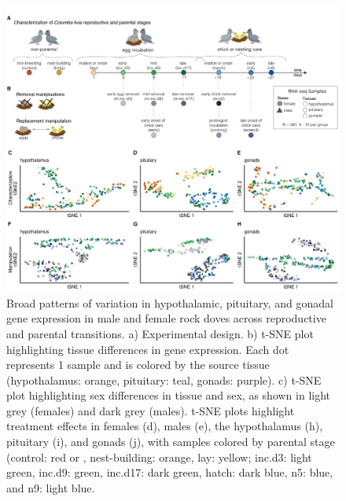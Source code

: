 \begin{figure}[h]
  \centering
  \includegraphics[width=1.0\textwidth]{../../figures/fig1-1}
  \caption{Broad patterns of variation in hypothalamic, pituitary, and gonadal gene expression in male and female rock doves across reproductive and parental transitions. a) Experimental design. b) t-SNE plot highlighting tissue differences in gene expression. Each dot represents 1 sample and is colored by the source tissue (hypothalamus: orange, pituitary: teal, gonads: purple). c) t-SNE plot highlighting sex differences in tissue and sex, as shown in light grey (females) and dark grey (males). t-SNE plots highlight treatment effects in females (d), males (e), the hypothalamus (h), pituitary (i), and gonads (j), with samples colored by parental stage (control: red or , nest-building: orange, lay: yellow; inc.d3: light green, inc.d9: green, inc.d17: dark green, hatch: dark blue, n5: blue, and n9: light blue.}
  \label{figure:fig1}
\end{figure}

\newpage

